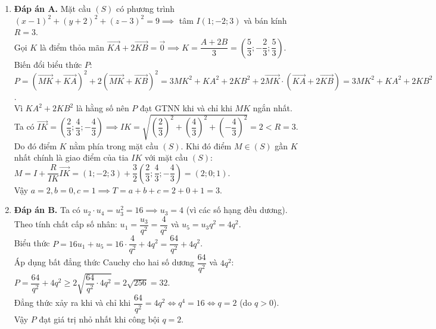 \documentclass[12pt,a4paper]{article}
\begin{document}
\begin{enumerate}[label=\textbf{Câu \arabic*:}, leftmargin=*]
\item \textbf{Đáp án A.} Mặt cầu $(S)$ có phương trình $(x - 1)^2 + (y + 2)^2 + (z - 3)^2 = 9 \implies$ tâm $I(1; -2; 3)$ và bán kính $R = 3$.\\
Gọi $K$ là điểm thỏa mãn $\overrightarrow{KA} + 2\overrightarrow{KB} = \vec{0} \implies K = \dfrac{A + 2B}{3} = \left(\dfrac{5}{3}; -\dfrac{2}{3}; \dfrac{5}{3}\right)$.\\
Biến đổi biểu thức $P$:
$P = (\overrightarrow{MK} + \overrightarrow{KA})^2 + 2(\overrightarrow{MK} + \overrightarrow{KB})^2 = 3MK^2 + KA^2 + 2KB^2 + 2\overrightarrow{MK} \cdot (\overrightarrow{KA} + 2\overrightarrow{KB}) = 3MK^2 + KA^2 + 2KB^2$.\\
Vì $KA^2 + 2KB^2$ là hằng số nên $P$ đạt GTNN khi và chỉ khi $MK$ ngắn nhất.\\
Ta có $\overrightarrow{IK} = \left(\dfrac{2}{3}; \dfrac{4}{3}; -\dfrac{4}{3}\right) \implies IK = \sqrt{\left(\dfrac{2}{3}\right)^2 + \left(\dfrac{4}{3}\right)^2 + \left(-\dfrac{4}{3}\right)^2} = 2 < R = 3$.\\
Do đó điểm $K$ nằm phía trong mặt cầu $(S)$. Khi đó điểm $M \in (S)$ gần $K$ nhất chính là giao điểm của tia $IK$ với mặt cầu $(S)$:\\
$M = I + \dfrac{R}{IK} \overrightarrow{IK} = (1; -2; 3) + \dfrac{3}{2}\left(\dfrac{2}{3}; \dfrac{4}{3}; -\dfrac{4}{3}\right) = (2; 0; 1)$.\\
Vậy $a = 2, b = 0, c = 1 \implies T = a + b + c = 2 + 0 + 1 = 3$.

\item \textbf{Đáp án B.} Ta có $u_2 \cdot u_4 = u_3^2 = 16 \implies u_3 = 4$ (vì các số hạng đều dương).\\
Theo tính chất cấp số nhân: $u_1 = \dfrac{u_3}{q^2} = \dfrac{4}{q^2}$ và $u_5 = u_3 q^2 = 4q^2$.\\
Biểu thức $P = 16u_1 + u_5 = 16 \cdot \dfrac{4}{q^2} + 4q^2 = \dfrac{64}{q^2} + 4q^2$.\\
Áp dụng bất đẳng thức Cauchy cho hai số dương $\dfrac{64}{q^2}$ và $4q^2$:\\
$P = \dfrac{64}{q^2} + 4q^2 \ge 2\sqrt{\dfrac{64}{q^2} \cdot 4q^2} = 2\sqrt{256} = 32$.\\
Đẳng thức xảy ra khi và chỉ khi $\dfrac{64}{q^2} = 4q^2 \iff q^4 = 16 \iff q = 2$ (do $q > 0$).\\
Vậy $P$ đạt giá trị nhỏ nhất khi công bội $q = 2$.


\end{enumerate}
\end{document}
